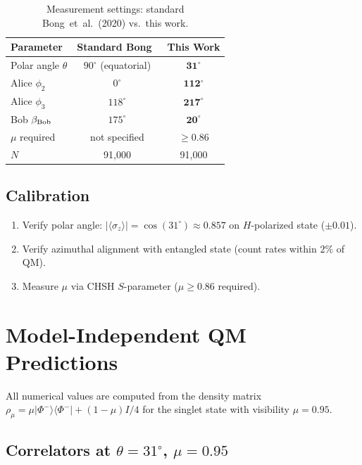 \documentclass[twocolumn,aps,pra,superscriptaddress,floatfix,10pt]{revtex4-2}
\begin{document}
\begin{table}[t]
\centering
\caption{Measurement settings: standard Bong~et~al.~(2020) vs.\ this work.}
\label{tab:settings}
\begin{tabular}{lcc}
\toprule
Parameter & Standard Bong~\cite{Bong2020} & This Work \\
\midrule
Polar angle $\theta$     & $90^\circ$ (equatorial) & $\mathbf{31^\circ}$ \\
Alice $\phi_2$           & $0^\circ$   & $\mathbf{112^\circ}$ \\
Alice $\phi_3$           & $118^\circ$ & $\mathbf{217^\circ}$ \\
Bob $\beta_{\rm Bob}$    & $175^\circ$ & $\mathbf{20^\circ}$ \\
$\mu$ required           & not specified & $\ge 0.86$ \\
$N$                      & 91{,}000    & 91{,}000 \\
\bottomrule
\end{tabular}
\end{table}

\subsection{Calibration}

\begin{enumerate}
\item Verify polar angle:
$|\langle\sigma_z\rangle| = \cos(31^\circ) \approx 0.857$ on
$H$-polarized state ($\pm 0.01$).
\item Verify azimuthal alignment with entangled state (count rates
within $2\%$ of QM).
\item Measure $\mu$ via CHSH $S$-parameter ($\mu \ge 0.86$ required).
\end{enumerate}

\section{Model-Independent QM Predictions}
\label{sec:predictions}

All numerical values are computed from the density matrix
$\rho_\mu = \mu|\Phi^-\rangle\langle\Phi^-| + (1-\mu)I/4$ for the
singlet state with visibility $\mu = 0.95$.

\subsection{Correlators at $\theta = 31^\circ$, $\mu = 0.95$}
\end{document}
